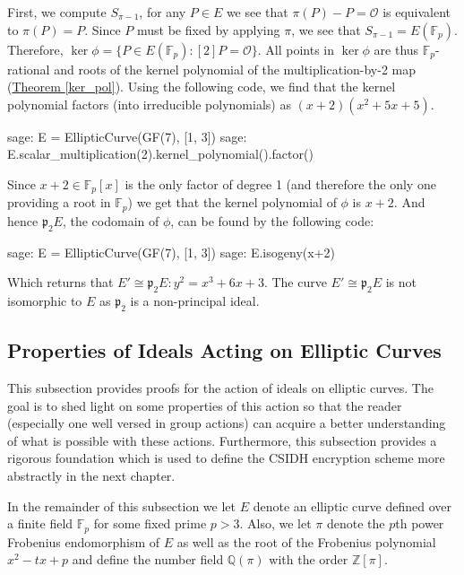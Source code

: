 \documentclass[openany, a4paper, 10pt]{book}
\theoremstyle{plain}
\theoremstyle{plain}
\theoremstyle{plain}
\theoremstyle{definition}
\theoremstyle{plain}
\theoremstyle{definition}
\theoremstyle{remark}
\newcommand{\theoref}[1]{\hyperref[#1]{Theorem \ref{#1}}}
\begin{document}
\begin{examplebox}
    First, we compute $S_{\pi-1}$, for any $P \in E$ we see that $\pi(P) - P = \mathcal O$ is equivalent to $\pi(P) = P$.
    Since $P$ must be fixed by applying $\pi$, we see that $S_{\pi-1} = E(\mathbb F_p)$.
    Therefore, $\ker\phi = \{ P \in E(\mathbb F_p): [2]P = \mathcal O \}$.
    All points in $\ker \phi$ are thus $\mathbb F_p$-rational and roots of the kernel polynomial of the multiplication-by-2 map (\theoref{ker_pol}).
    Using the following code, we find that the kernel polynomial factors (into irreducible polynomials) as $(x+2)(x^2+5x+5)$.
    \begin{python}
sage: E = EllipticCurve(GF(7), [1, 3])
sage: E.scalar_multiplication(2).kernel_polynomial().factor()
    \end{python}
    Since $x+2 \in \mathbb F_p[x]$ is the only factor of degree 1 (and therefore the only one providing a root in $\mathbb F_p$) we get that the kernel polynomial of $\phi$ is $x+2$.
    And hence $\mathfrak p_2 E$, the codomain of $\phi$, can be found by the following code:
    \begin{python}
sage: E = EllipticCurve(GF(7), [1, 3])
sage: E.isogeny(x+2)
    \end{python}
    Which returns that $E' \cong \mathfrak p_2E: y^2 = x^3 + 6x + 3$.
    The curve $E' \cong\mathfrak p_2E$ is not isomorphic to $E$ as $\mathfrak p_2$ is a non-principal ideal.
\end{examplebox}


\subsection{Properties of Ideals Acting on Elliptic Curves}\label{ideal_proof}
This subsection provides proofs for the action of ideals on elliptic curves.
The goal is to shed light on some properties of this action so that the reader (especially one well versed in group actions) can acquire a better understanding of what is possible with these actions.
Furthermore, this subsection provides a rigorous foundation which is used to define the CSIDH encryption scheme more abstractly in the next chapter.

In the remainder of this subsection we let $E$ denote an elliptic curve defined over a finite field $\mathbb F_p$ for some fixed prime $p>3$.
Also, we let $\pi$ denote the $p$th power Frobenius endomorphism of $E$ as well as the root of the Frobenius polynomial $x^2-tx+p$ and define the number field $\mathbb Q(\pi)$ with the order $\mathbb Z[\pi]$.
\end{document}
